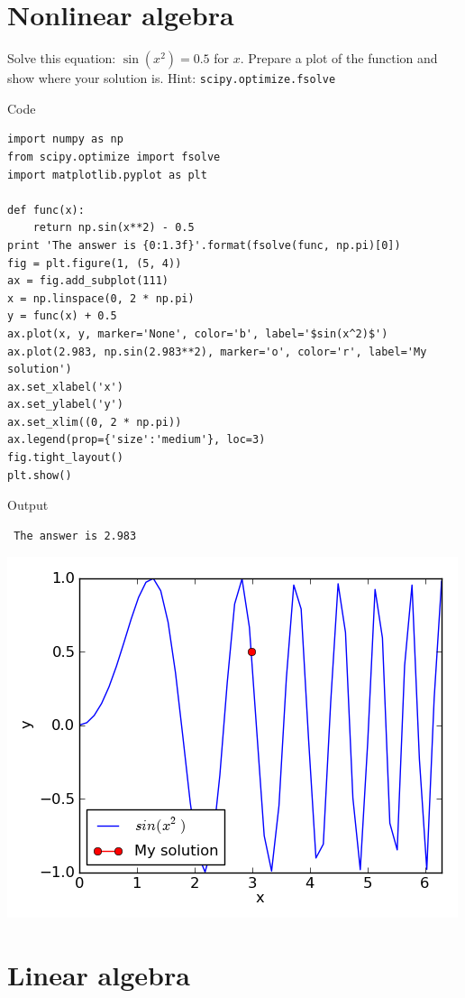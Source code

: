 \documentclass[11pt]{article}
\begin{document}
\section{Nonlinear algebra}
\label{sec-5}

Solve this equation: $\sin(x^2) = 0.5$ for $x$. Prepare a plot of the function
and show where your solution is. Hint: \texttt{scipy.optimize.fsolve}

Code

\begin{verbatim}
import numpy as np
from scipy.optimize import fsolve
import matplotlib.pyplot as plt

def func(x):
    return np.sin(x**2) - 0.5
print 'The answer is {0:1.3f}'.format(fsolve(func, np.pi)[0])
fig = plt.figure(1, (5, 4))
ax = fig.add_subplot(111)
x = np.linspace(0, 2 * np.pi)
y = func(x) + 0.5
ax.plot(x, y, marker='None', color='b', label='$sin(x^2)$')
ax.plot(2.983, np.sin(2.983**2), marker='o', color='r', label='My solution')
ax.set_xlabel('x')
ax.set_ylabel('y')
ax.set_xlim((0, 2 * np.pi))
ax.legend(prop={'size':'medium'}, loc=3)
fig.tight_layout()
plt.show()
\end{verbatim}

Output
\begin{verbatim}
 The answer is 2.983
\end{verbatim}

\includegraphics[width=.9\linewidth]{./hw1_linear-algebra.png}
\section{Linear algebra}
\label{sec-6}
\end{document}
